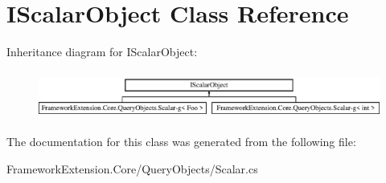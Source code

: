 \hypertarget{class_i_scalar_object-g}{\section{I\-Scalar\-Object Class Reference}
\label{class_i_scalar_object-g}
}
Inheritance diagram for I\-Scalar\-Object\-:\begin{figure}[H]
\begin{center}
\leavevmode
\includegraphics[height=1.586402cm]{class_i_scalar_object-g}
\end{center}
\end{figure}


The documentation for this class was generated from the following file\-:\begin{DoxyCompactItemize}
\item 
Framework\-Extension.\-Core/\-Query\-Objects/Scalar.\-cs\end{DoxyCompactItemize}
